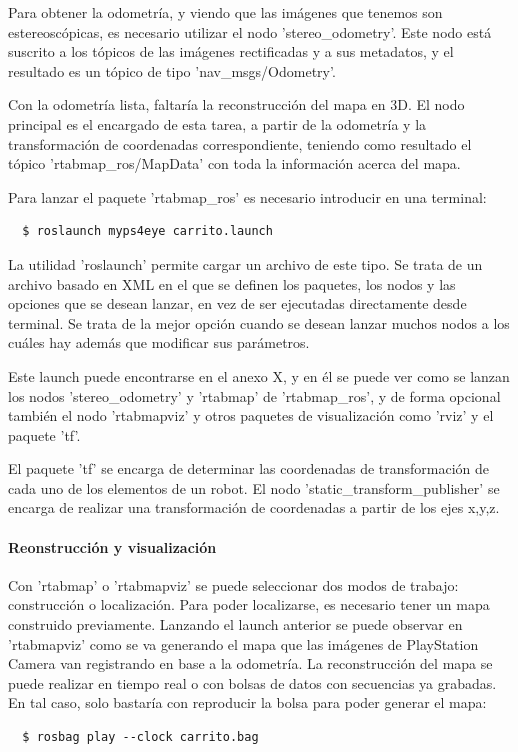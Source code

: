 Para obtener la odometría, y viendo que las imágenes que tenemos son
estereoscópicas, es necesario utilizar el nodo 'stereo\_odometry'. Este nodo
está suscrito a los tópicos de las imágenes rectificadas y a sus metadatos, y el
resultado es un tópico de tipo 'nav\_msgs/Odometry'.

Con la odometría lista, faltaría la reconstrucción del mapa en 3D. El nodo
principal es el encargado de esta tarea, a partir de la odometría y la
transformación de coordenadas correspondiente, teniendo como resultado el tópico
'rtabmap\_ros/MapData' con toda la información acerca del mapa.

Para lanzar el paquete 'rtabmap\_ros' es necesario introducir en una terminal:
\\
\begin{lstlisting}
  $ roslaunch myps4eye carrito.launch
\end{lstlisting}

La utilidad 'roslaunch' permite cargar un archivo de este tipo. Se trata de un
archivo basado en XML en el que se definen los paquetes, los nodos y las
opciones que se desean lanzar, en vez de ser ejecutadas directamente desde
terminal. Se trata de la mejor opción cuando se desean lanzar muchos nodos a los
cuáles hay además que modificar sus parámetros.

Este launch puede encontrarse en el anexo X, y en él se puede ver como se lanzan
los nodos 'stereo\_odometry' y 'rtabmap' de 'rtabmap\_ros', y de forma opcional
también el nodo 'rtabmapviz' y otros paquetes de visualización como 'rviz' y el
paquete 'tf'.

El paquete 'tf' se encarga de determinar las coordenadas de transformación de
cada uno de los elementos de un robot. El nodo 'static\_transform\_publisher' se
encarga de realizar una transformación de coordenadas a partir de los ejes
x,y,z.

\paragraph{Reonstrucción y visualización} \hspace{0pt}

Con 'rtabmap' o 'rtabmapviz' se puede seleccionar dos modos de trabajo:
construcción o localización. Para poder localizarse, es necesario tener un mapa
construido previamente. Lanzando el launch anterior se puede observar en
'rtabmapviz' como se va generando el mapa que las imágenes de PlayStation Camera
van registrando en base a la odometría. La reconstrucción del mapa se puede
realizar en tiempo real o con bolsas de datos con secuencias ya grabadas. En tal
caso, solo bastaría con reproducir la bolsa para poder generar el mapa:
\\
\begin{lstlisting}
  $ rosbag play --clock carrito.bag
\end{lstlisting}

